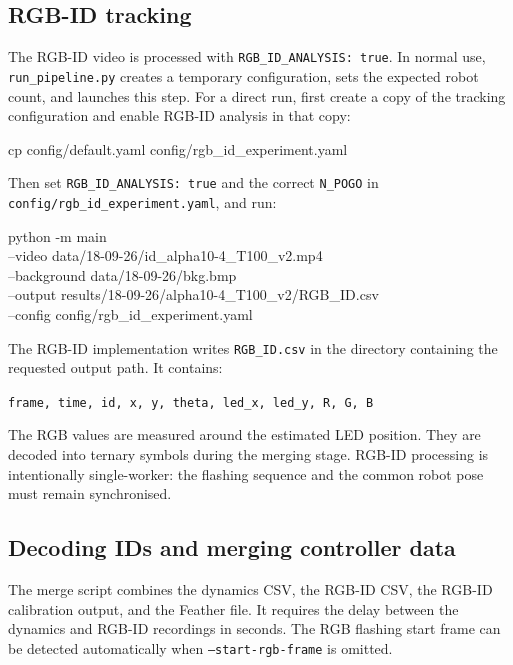 \documentclass[11pt,a4paper]{article}
\begin{document}
\subsection{RGB-ID tracking}

The RGB-ID video is processed with \texttt{RGB\_ID\_ANALYSIS: true}. In normal use, \texttt{run\_pipeline.py} creates a temporary configuration, sets the expected robot count, and launches this step. For a direct run, first create a copy of the tracking configuration and enable RGB-ID analysis in that copy:

\begin{codeblock}
cp config/default.yaml config/rgb_id_experiment.yaml
\end{codeblock}

Then set \texttt{RGB\_ID\_ANALYSIS: true} and the correct \texttt{N\_POGO} in \texttt{config/rgb\_id\_experiment.yaml}, and run:

\begin{codeblock}
python -m main \\
  --video data/18-09-26/id_alpha10-4_T100_v2.mp4 \\
  --background data/18-09-26/bkg.bmp \\
  --output results/18-09-26/alpha10-4_T100_v2/RGB_ID.csv \\
  --config config/rgb_id_experiment.yaml
\end{codeblock}

The RGB-ID implementation writes \texttt{RGB\_ID.csv} in the directory containing the requested output path. It contains:

\begin{center}
\texttt{frame, time, id, x, y, theta, led\_x, led\_y, R, G, B}
\end{center}

The RGB values are measured around the estimated LED position. They are decoded into ternary symbols during the merging stage. RGB-ID processing is intentionally single-worker: the flashing sequence and the common robot pose must remain synchronised.

\subsection{Decoding IDs and merging controller data}

The merge script combines the dynamics CSV, the RGB-ID CSV, the RGB-ID calibration output, and the Feather file. It requires the delay between the dynamics and RGB-ID recordings in seconds. The RGB flashing start frame can be detected automatically when \texttt{--start-rgb-frame} is omitted.
\end{document}

